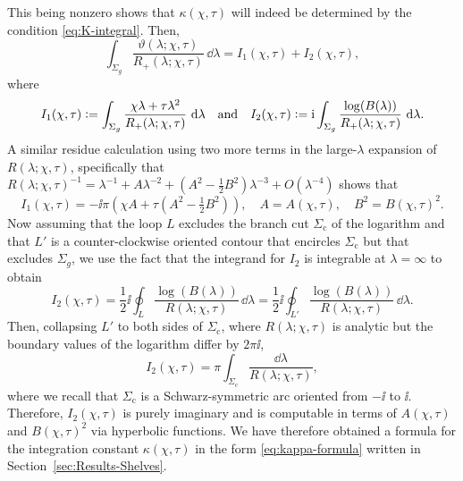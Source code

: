 This being nonzero shows that $\kappa(\chi,\tau)$ will indeed be determined by the condition \eqref{eq:K-integral}.  Then,
\begin{equation}
\int_{\Sigma_g}\frac{\vartheta(\lambda;\chi,\tau)}{R_+(\lambda;\chi,\tau)}\,\dd\lambda = I_1(\chi,\tau)+I_2(\chi,\tau),
\end{equation}
where
\begin{equation}
I_1(\chi,\tau)\vcentcolon=\int_{\Sigma_g}\frac{\chi\lambda+\tau\lambda^2}{R_+(\lambda;\chi,\tau)}\,\,\mathrm{d}\lambda\quad\text{and}\quad
I_2(\chi,\tau)\vcentcolon=\mathrm{i}\int_{\Sigma_g}
\frac{\log(B(\lambda))}{R_+(\lambda;\chi,\tau)}\,\,\mathrm{d}\lambda.
\label{eq:I1-I2}
\end{equation}
A similar residue calculation using two more terms in the large-$\lambda$ expansion of $R(\lambda;\chi,\tau)$, specifically that $R(\lambda;\chi,\tau)^{-1}=\lambda^{-1}+A\lambda^{-2}+(A^2-\tfrac{1}{2}B^2)\lambda^{-3}+O(\lambda^{-4})$ shows that
\begin{equation}
I_1(\chi,\tau)=-\ii\pi (\chi A +\tau(A^2-\tfrac{1}{2}B^2)),\quad A=A(\chi,\tau),\quad B^2=B(\chi,\tau)^2.
\end{equation}
Now assuming that the loop $L$ excludes the branch cut $\Sigma_\mathrm{c}$ of the logarithm and that $L'$ is a counter-clockwise oriented contour that encircles $\Sigma_\mathrm{c}$ but that excludes $\Sigma_g$, we use the fact that the integrand for $I_2$ is integrable at $\lambda=\infty$ to obtain
\begin{equation}
I_2(\chi,\tau)=\frac{1}{2}\ii\oint_L
\frac{\log(B(\lambda))}{R(\lambda;\chi,\tau)}\,\dd\lambda = \frac{1}{2}\ii\oint_{L'}%
\frac{\log(B(\lambda))}{R(\lambda;\chi,\tau)}\,\dd\lambda.
\label{eq:I2-identities}
\end{equation}
Then, collapsing $L'$ to both sides of $\Sigma_\mathrm{c}$, where $R(\lambda;\chi,\tau)$ is analytic but the boundary values of the logarithm differ by $2\pi\ii$, 
\begin{equation}
I_2(\chi,\tau)=\pi\int_{\Sigma_\mathrm{c}}\frac{\dd\lambda}{R(\lambda;\chi,\tau)},
\end{equation}
where we recall that $\Sigma_\mathrm{c}$ is a Schwarz-symmetric arc oriented from $-\ii$ to $\ii$.  Therefore, $I_2(\chi,\tau)$ is
purely imaginary and is computable in terms of $A(\chi,\tau)$ and $B(\chi,\tau)^2$ via hyperbolic functions.  We have therefore obtained a formula for the integration constant $\kappa(\chi,\tau)$ in the form \eqref{eq:kappa-formula} written in Section~\ref{sec:Results-Shelves}.

